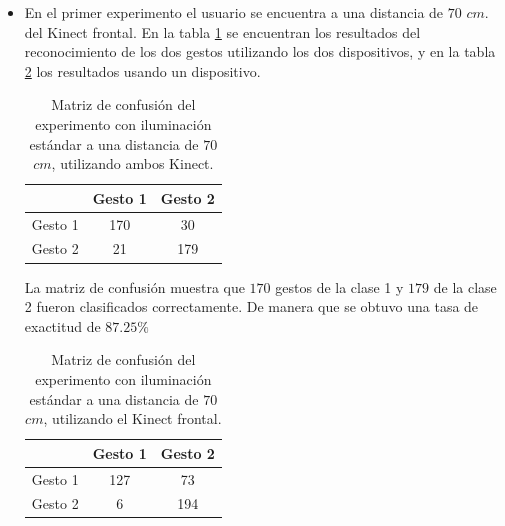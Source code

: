 \begin{itemize}

\item En el primer experimento el usuario se encuentra a una distancia de $70$ $cm.$ del Kinect frontal. En la tabla \ref{table:70L2K} se encuentran los resultados del reconocimiento de los dos gestos utilizando los dos dispositivos, y en la tabla \ref{table:70L1K} los resultados usando un dispositivo.  


\begin{table}[h!] 
\begin{center}
\begin{tabular}{ r || c | c |}  
        & Gesto 1 & Gesto 2 \\ \hline \hline  
Gesto 1 & 170  &  30  \\ \hline  
Gesto 2 & 21   & 179 \\   
\end{tabular}
\end{center} 
\caption{Matriz de confusión del experimento con iluminación estándar a una distancia de $70$ $cm$, utilizando ambos Kinect.} 
\label{table:70L2K}
\end{table}

La matriz de confusión muestra que $170$ gestos de la clase 1 y $179$ de la clase 2 fueron clasificados correctamente. De manera que se obtuvo una tasa de exactitud de $87.25 \%$  

\begin{table}[h!] 
\begin{center}
\begin{tabular}{ r || c | c |} 
        & Gesto 1 & Gesto 2 \\ \hline \hline  
Gesto 1 & 127  &  73  \\ \hline  
Gesto 2 & 6    &  194 \\   
\end{tabular}
\end{center} 
\caption{Matriz de confusión del experimento con iluminación estándar a una distancia de $70$ $cm$, utilizando el Kinect frontal.}
\label{table:70L1K}
\end{table}


\end{itemize}
